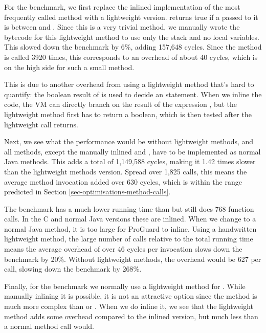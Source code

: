 For the  benchmark, we first replace the inlined implementation of the most frequently called method with a lightweight version.  returns true if a  passed to it is between  and . Since this is a very trivial method, we manually wrote the bytecode for this lightweight method to use only the stack and no local variables. This slowed down the benchmark by 6\%, adding 157,648 cycles. Since the method is called 3920 times, this corresponds to an overhead of about 40 cycles, which is on the high side for such a small method.

This is due to another overhead from using a lightweight method that's hard to quantify: the boolean result of  is used to decide an  statement. When we inline the code, the VM can directly branch on the result of the expression , but the lightweight method first has to return a boolean, which is then tested after the lightweight call returns.

Next, we see what the performance would be without lightweight methods, and all methods, except the manually inlined  and , have to be implemented as normal Java methods. This adds a total of 1,149,588 cycles, making it 1.42 times slower than the lightweight methods version. Spread over 1,825 calls, this means the average method invocation added over 630 cycles, which is within the range predicted in Section \ref{sec-optimisations-method-calls}.

The  benchmark has a much lower running time than  but still does 768 function calls. In the C and normal Java versions these are inlined. When we change  to a normal Java method, it is too large for ProGuard to inline. Using a handwritten lightweight method, the large number of calls relative to the total running time means the average overhead of over 46 cycles per invocation slows down the benchmark by 20\%. Without lightweight methods, the overhead would be 627 per call, slowing down the benchmark by 268\%.

Finally, for the  benchmark we normally use a lightweight method for . While manually inlining it is possible, it is not an attractive option since the  method is much more complex than  or . When we do inline it, we see that the lightweight method adds some overhead compared to the inlined version, but much less than a normal method call would.

